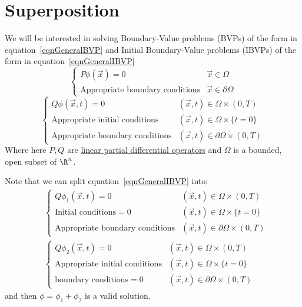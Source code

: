 \documentclass[../Main.tex]{subfiles}
\begin{document}
\section{Superposition}
We will be interested in solving Boundary-Value problems (BVPs) of the form in equation~\ref{eqnGeneralBVP} and Initial Boundary-Value problems (IBVPs) of the form in equation~\ref{eqnGeneralIBVP}
\begin{equation}
    \begin{cases}
        P\phi(\vec{x}) = 0 & \vec{x} \in \Omega \\
        \text{Appropriate boundary conditions} & \vec{x} \in \partial \Omega
    \end{cases}
    \label{eqnGeneralBVP}
\end{equation}
\begin{equation}
    \begin{cases}
        Q\phi(\vec{x}, t) = 0 & (\vec{x}, t) \in \Omega \times (0, T) \\
        \text{Appropriate initial conditions} & (\vec{x}, t) \in \Omega \times \{t = 0\} \\
        \text{Appropriate boundary conditions} & (\vec{x}, t) \in \partial \Omega \times (0, T)
    \end{cases}
    \label{eqnGeneralIBVP}
\end{equation}
Where here $P, Q$ are \underline{linear partial differential operators} and $\Omega$ is a bounded, open subset of $\R^n$.

Note that we can split equation~\ref{eqnGeneralIBVP} into:
\begin{align*}
    &\begin{cases}
        Q\phi_1(\vec{x}, t) = 0 & (\vec{x}, t) \in \Omega \times (0, T) \\
        \text{Initial conditions} = 0 & (\vec{x}, t) \in \Omega \times \{t = 0\} \\
        \text{Appropriate boundary conditions} & (\vec{x}, t) \in \partial \Omega \times (0, T)
    \end{cases} \\
    &\begin{cases}
        Q\phi_2(\vec{x}, t) = 0 & (\vec{x}, t) \in \Omega \times (0, T) \\
        \text{Appropriate initial conditions} & (\vec{x}, t) \in \Omega \times \{t = 0\} \\
        \text{boundary conditions} = 0 & (\vec{x}, t) \in \partial \Omega \times (0, T)
    \end{cases}
\end{align*}
and then $\phi = \phi_1 + \phi_2$ is a valid solution.
\end{document}
